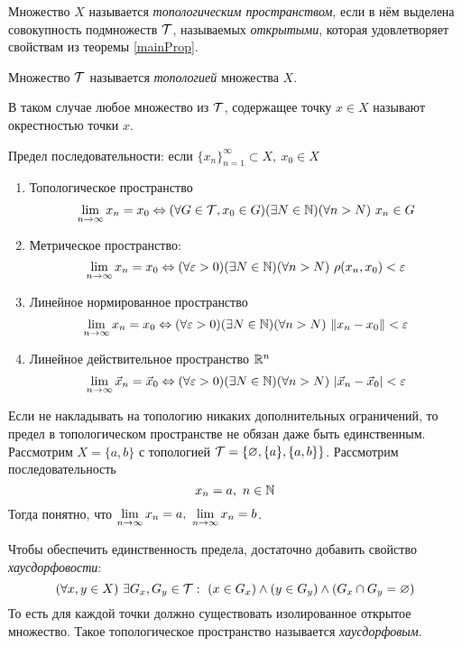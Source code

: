 \begin{definition}
	Множество $X$ называется \textit{топологическим пространством},
	если в нём выделена совокупность подмножеств $\mathcal{T}$,
	называемых \textit{открытыми}, которая удовлетворяет
	свойствам из теоремы \ref{mainProp}.
	
	Множество $\mathcal{T}$ называется \textit{топологией} множества $X$.

	В таком случае любое множество из $\mathcal{T}$,
	содержащее точку $x \in X$ называют
	окрестностью точки $x$.
\end{definition}

\begin{definition} Предел последовательности:
	если $\{x_n\}_{n = 1}^\infty \subset X,\ x_0 \in X$
	\begin{enumerate}
		\item Топологическое пространство
			\[
				\lim\limits_{n \to \infty} x_n = x_0 \Leftrightarrow
				(\forall G \in \mathcal{T}, x_0 \in G)(\exists N \in \mathbb{N})
				(\forall n > N)\ x_n \in G
			\]
		\item Метрическое пространство: 
			\[
				\lim\limits_{n \to \infty} x_n = x_0 \Leftrightarrow
				(\forall \varepsilon > 0)(\exists N \in \mathbb{N})
				(\forall n > N)\ \rho(x_n, x_0) < \varepsilon
			\]
		\item Линейное нормированное пространство
			\[
				\lim\limits_{n \to \infty} x_n = x_0 \Leftrightarrow
				(\forall \varepsilon > 0)(\exists N \in \mathbb{N})
				(\forall n > N)\ \|x_n - x_0\| < \varepsilon
			\]
		\item Линейное действительное пространство $\mathbb{R}^n$	
			\[
				\lim\limits_{n \to \infty} \vec{x}_n = \vec{x}_0 \Leftrightarrow
				(\forall \varepsilon > 0)(\exists N \in \mathbb{N})
				(\forall n > N)\ |\vec{x}_n - \vec{x}_0| < \varepsilon
			\]
	\end{enumerate}
\end{definition}

\begin{example}
	Если не накладывать на топологию никаких
	дополнительных ограничений, то предел в топологическом
	пространстве не
	обязан даже быть единственным. Рассмотрим
	$X = \{a, b\}$ с топологией $\mathcal{T} =
	\{\varnothing, \{a\}, \{a, b\}\}$. Рассмотрим
	последовательность
	\[
		x_n = a,\ n \in \mathbb{N}
	\]
	Тогда понятно, что $\lim\limits_{n \to \infty} x_n =
	a,\ \lim\limits_{n \to \infty} x_n = b$.
\end{example}

\begin{anote}
	Чтобы обеспечить единственность предела,
	достаточно добавить свойство \textit{хаусдорфовости}:
	\[
		(\forall x, y \in X)\ \exists G_x, G_y \in
		\mathcal{T} :\  (x \in G_x) \wedge (y \in G_y)
		\wedge (G_x \cap G_y = \varnothing)
	\]
	То есть для каждой точки должно существовать
	изолированное открытое множество.
	Такое топологическое пространство называется
	\textit{хаусдорфовым}.
\end{anote}


